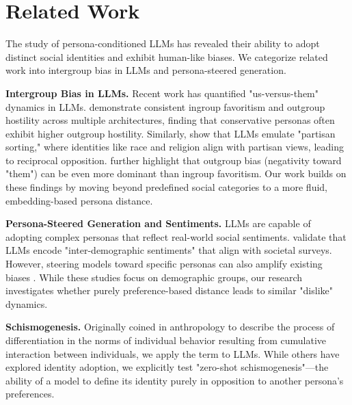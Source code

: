 \section{Related Work}

The study of persona-conditioned LLMs has revealed their ability to adopt distinct social identities and exhibit human-like biases. We categorize related work into intergroup bias in LLMs and persona-steered generation.

{\bf Intergroup Bias in LLMs.} Recent work has quantified "us-versus-them" dynamics in LLMs. \citet{prama2025us} demonstrate consistent ingroup favoritism and outgroup hostility across multiple architectures, finding that conservative personas often exhibit higher outgroup hostility. Similarly, \citet{dong2024persona} show that LLMs emulate "partisan sorting," where identities like race and religion align with partisan views, leading to reciprocal opposition. \citet{dong2024i} further highlight that outgroup bias (negativity toward "them") can be even more dominant than ingroup favoritism. Our work builds on these findings by moving beyond predefined social categories to a more fluid, embedding-based persona distance.

{\bf Persona-Steered Generation and Sentiments.} LLMs are capable of adopting complex personas that reflect real-world social sentiments. \citet{tanaka2024are} validate that LLMs encode "inter-demographic sentiments" that align with societal surveys. However, steering models toward specific personas can also amplify existing biases \cite{liu2024evaluating}. While these studies focus on demographic groups, our research investigates whether purely preference-based distance leads to similar "dislike" dynamics.

{\bf Schismogenesis.} Originally coined in anthropology to describe the process of differentiation in the norms of individual behavior resulting from cumulative interaction between individuals, we apply the term to LLMs. While others have explored identity adoption, we explicitly test "zero-shot schismogenesis"—the ability of a model to define its identity purely in opposition to another persona's preferences.
